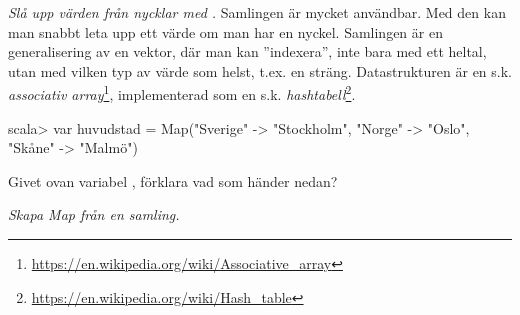 {{\Subtask {}

\Subtask {}

\Subtask {}

\Subtask {}

\Subtask {}


\Task \emph{Slå upp värden från nycklar med .} Samlingen  är mycket användbar. Med den kan man snabbt leta upp ett värde om man har en nyckel. Samlingen  är en generalisering av en vektor, där man kan ''indexera'', inte bara med ett heltal, utan med vilken typ av värde som helst, t.ex. en sträng. Datastrukturen  är en s.k. \emph{associativ array}\footnote{\href{https://en.wikipedia.org/wiki/Associative_array}{https://en.wikipedia.org/wiki/Associative\_array}}, implementerad som en s.k. \emph{hashtabell}\footnote{\href{https://en.wikipedia.org/wiki/Hash_table}{https://en.wikipedia.org/wiki/Hash\_table}}. 
\begin{REPL}
scala> var huvudstad = 
  Map("Sverige" -> "Stockholm", "Norge" -> "Oslo", "Skåne" -> "Malmö") 
\end{REPL}
Givet ovan variabel , förklara vad som händer nedan?

\Subtask {}

\Subtask {}

\Subtask {}

\Subtask {}

\Subtask {}

\Subtask {} 

\Subtask {}

\Subtask {}

\Subtask {}

\Subtask {}

\Subtask {}

\Subtask {}

\Subtask {}



\Task \emph{Skapa Map från en samling.}

}}
